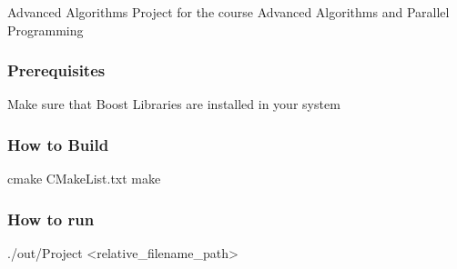 Advanced Algorithms Project for the course Advanced Algorithms and Parallel Programming

\subsubsection*{Prerequisites}


\begin{DoxyItemize}
\item Make sure that Boost Libraries are installed in your system
\end{DoxyItemize}

\subsubsection*{How to Build}


\begin{DoxyCode}
cmake CMakeList.txt
make
\end{DoxyCode}


\subsubsection*{How to run}


\begin{DoxyCode}
./out/Project <relative\_filename\_path>
\end{DoxyCode}
 
